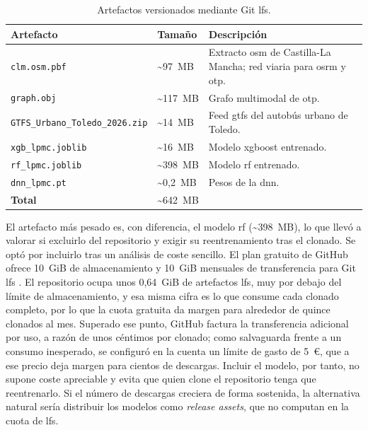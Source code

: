 \begin{table}[htbp]
  \caption[Artefactos versionados mediante Git LFS.]{Artefactos versionados mediante Git \gls{lfs}.}
  \label{tab:lfs_artefactos}
  \centering
  \begin{tabular}{llp{6.2cm}}
    \hline
    \textbf{Artefacto} & \textbf{Tamaño} & \textbf{Descripción} \\
    \hline
    \texttt{clm.osm.pbf}                  & \textasciitilde{}97~MB  & Extracto \gls{osm} de Castilla-La Mancha; red viaria para \gls{osrm} y \gls{otp}. \\
    \texttt{graph.obj}                    & \textasciitilde{}117~MB & Grafo multimodal de \gls{otp}. \\
    \texttt{GTFS\_Urbano\_Toledo\_2026.zip} & \textasciitilde{}14~MB  & Feed \gls{gtfs} del autobús urbano de Toledo. \\
    \texttt{xgb\_lpmc.joblib}             & \textasciitilde{}16~MB  & Modelo \gls{xgboost} entrenado. \\
    \texttt{rf\_lpmc.joblib}              & \textasciitilde{}398~MB & Modelo \gls{rf} entrenado. \\
    \texttt{dnn\_lpmc.pt}                 & \textasciitilde{}0,2~MB & Pesos de la \gls{dnn}. \\
    \hline
    \textbf{Total}                        & \textasciitilde{}642~MB & \\
    \hline
  \end{tabular}
\end{table}

El artefacto más pesado es, con diferencia, el modelo \acrlong{rf} (\textasciitilde{}398~MB), lo que llevó a valorar si excluirlo del repositorio y exigir su reentrenamiento tras el clonado. Se optó por incluirlo tras un análisis de coste sencillo. El plan gratuito de GitHub ofrece 10~GiB de almacenamiento y 10~GiB mensuales de transferencia para Git \gls{lfs} \cite{GitHubLFSBilling}. El repositorio ocupa unos 0,64~GiB de artefactos \gls{lfs}, muy por debajo del límite de almacenamiento, y esa misma cifra es lo que consume cada clonado completo, por lo que la cuota gratuita da margen para alrededor de quince clonados al mes. Superado ese punto, GitHub factura la transferencia adicional por uso, a razón de unos céntimos por clonado; como salvaguarda frente a un consumo inesperado, se configuró en la cuenta un límite de gasto de 5~€, que a ese precio deja margen para cientos de descargas. Incluir el modelo, por tanto, no supone coste apreciable y evita que quien clone el repositorio tenga que reentrenarlo. Si el número de descargas creciera de forma sostenida, la alternativa natural sería distribuir los modelos como \textit{release assets}, que no computan en la cuota de \gls{lfs}.

